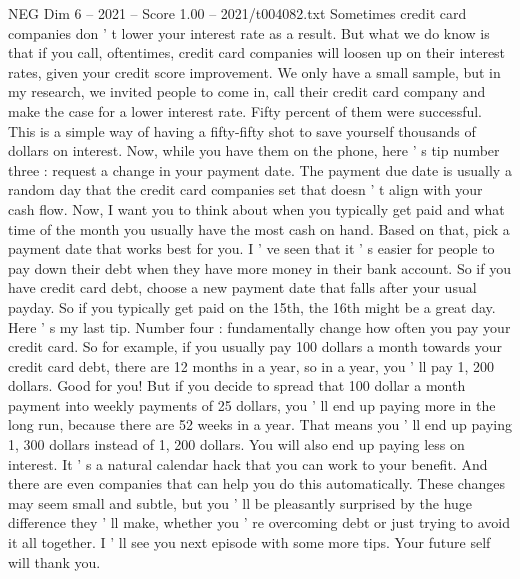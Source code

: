 \begin{textsample}{NEG Dim 6 – 2021 – Score 1.00 – 2021/t004082.txt}
Sometimes credit card companies don ' t lower your interest rate as a result.
But what we do know is that if you call, oftentimes, credit card companies will loosen up on their interest rates, given your credit score improvement.
We only have a small sample, but in my research, we invited people to come in, call their credit card company and make the case for a lower interest rate.
Fifty percent of them were successful.
This is a simple way of having a fifty-fifty shot to save yourself thousands of dollars on interest.
Now, while you have them on the phone, here ' s tip number three : request a change in your payment date.
The payment due date is usually a random day that the credit card companies set that doesn ' t align with your cash flow.
Now, I want you to think about when you typically get paid and what time of the month you usually have the most cash on hand.
Based on that, pick a payment date that works best for you.
I ' ve seen that it ' s easier for people to pay down their debt when they have more money in their bank account.
So if you have credit card debt, choose a new payment date that falls after your usual payday.
So if you typically get paid on the 15th, the 16th might be a great day.
Here ' s my last tip.
Number four : fundamentally change how often you pay your credit card.
So for example, if you usually pay 100 dollars a month towards your credit card debt, there are 12 months in a year, so in a year, you ' ll pay 1, 200 dollars.
Good for you!
But if you decide to spread that 100 dollar a month payment into weekly payments of 25 dollars, you ' ll end up paying more in the long run, because there are 52 weeks in a year.
That means you ' ll end up paying 1, 300 dollars instead of 1, 200 dollars.
You will also end up paying less on interest.
It ' s a natural calendar hack that you can work to your benefit.
And there are even companies that can help you do this automatically.
These changes may seem small and subtle, but you ' ll be pleasantly surprised by the huge difference they ' ll make, whether you ' re overcoming debt or just trying to avoid it all together.
I ' ll see you next episode with some more tips.
Your future self will thank you.

\end{textsample}

